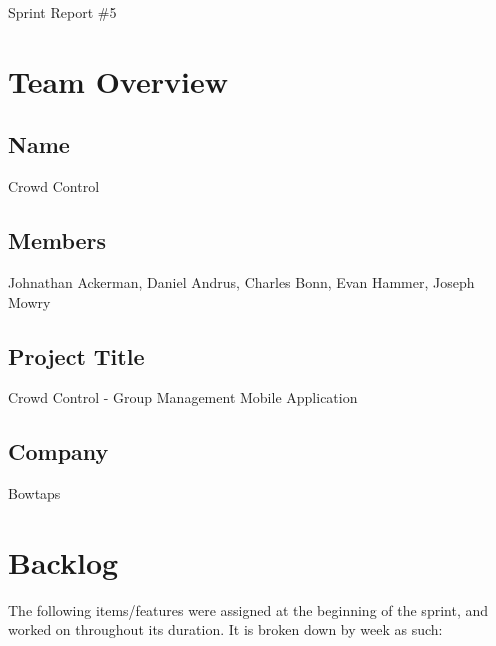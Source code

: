 \documentclass[11pt]{article}
\begin{document}
{\fontsize{16}{16}\selectfont Sprint Report \#5}

\section*{Team Overview}

\subsection*{Name}
Crowd Control
\subsection*{Members}
Johnathan Ackerman, Daniel Andrus, Charles Bonn, Evan Hammer, Joseph Mowry
\subsection*{Project Title}
Crowd Control - Group Management Mobile Application
\subsection*{Company}
Bowtaps


\section*{Backlog}
The following items/features were assigned at the beginning of the sprint, and worked on throughout its duration. It is broken down by week as such:
\end{document}
